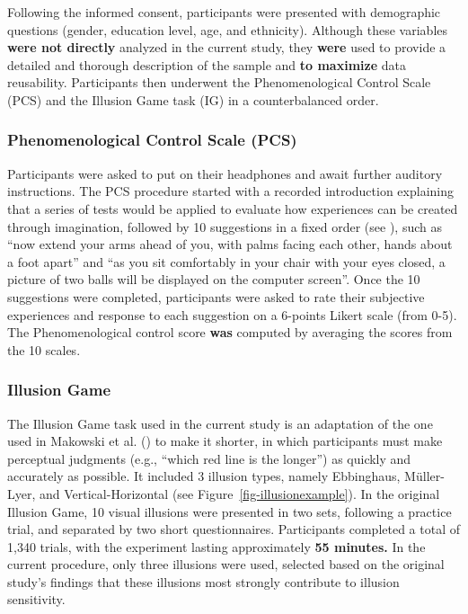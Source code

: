 \documentclass[
  man,
  floatsintext,
  longtable,
  nolmodern,
  notxfonts,
  notimes,
  colorlinks=true,linkcolor=blue,citecolor=blue,urlcolor=blue]{apa7}
\begin{document}
Following the informed consent, participants were presented with
demographic questions (gender, education level, age, and ethnicity).
Although these variables \textbf{were not directly} analyzed in the
current study, they \textbf{were} used to provide a detailed and
thorough description of the sample and \textbf{to maximize} data
reusability. Participants then underwent the Phenomenological Control
Scale (PCS) and the Illusion Game task (IG) in a counterbalanced order.

\subsubsection{Phenomenological Control Scale
(PCS)}\label{phenomenological-control-scale-pcs}

Participants were asked to put on their headphones and await further
auditory instructions. The PCS procedure started with a recorded
introduction explaining that a series of tests would be applied to
evaluate how experiences can be created through imagination, followed by
10 suggestions in a fixed order (see ), such as ``now extend your arms ahead of you, with palms
facing each other, hands about a foot apart'' and ``as you sit
comfortably in your chair with your eyes closed, a picture of two balls
will be displayed on the computer screen''. Once the 10 suggestions were
completed, participants were asked to rate their subjective experiences
and response to each suggestion on a 6-points Likert scale (from 0-5).
The Phenomenological control score \textbf{was} computed by averaging
the scores from the 10 scales.

\subsubsection{Illusion Game}\label{illusion-game}

The Illusion Game task used in the current study is an adaptation of the
one used in Makowski et al. () to make
it shorter, in which participants must make perceptual judgments (e.g.,
``which red line is the longer'') as quickly and accurately as possible.
It included 3 illusion types, namely Ebbinghaus, Müller-Lyer, and
Vertical-Horizontal (see Figure~\ref{fig-illusionexample}). In the
original Illusion Game, 10 visual illusions were presented in two sets,
following a practice trial, and separated by two short questionnaires.
Participants completed a total of 1,340 trials, with the experiment
lasting approximately \textbf{55 minutes.} In the current procedure,
only three illusions were used, selected based on the original study's
findings that these illusions most strongly contribute to illusion
sensitivity.
\end{document}
